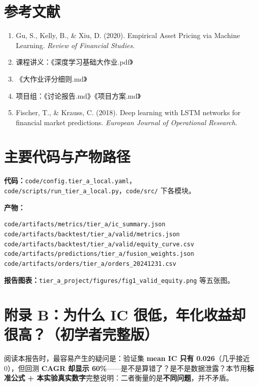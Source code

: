 \documentclass[UTF8,a4paper,12pt]{ctexart}
\begin{document}
\section*{参考文献}

\begin{enumerate}[leftmargin=2em]
  \item Gu, S., Kelly, B., \& Xiu, D. (2020). Empirical Asset Pricing via Machine Learning. \textit{Review of Financial Studies}.
  \item 课程讲义：《深度学习基础大作业.pdf》
  \item 《大作业评分细则.md》
  \item 项目组：《讨论报告.md》《项目方案.md》
  \item Fischer, T., \& Krauss, C. (2018). Deep learning with LSTM networks for financial market predictions. \textit{European Journal of Operational Research}.
\end{enumerate}

\appendix
\section{主要代码与产物路径}

\textbf{代码：}\texttt{code/config.tier\_a\_local.yaml}，\texttt{code/scripts/run\_tier\_a\_local.py}，\texttt{code/src/} 下各模块。

\textbf{产物：}
\begin{verbatim}
code/artifacts/metrics/tier_a/ic_summary.json
code/artifacts/backtest/tier_a/valid/metrics.json
code/artifacts/backtest/tier_a/valid/equity_curve.csv
code/artifacts/predictions/tier_a/fusion_weights.json
code/artifacts/orders/tier_a/orders_20241231.csv
\end{verbatim}

\textbf{报告图表：}\texttt{tier\_a\_project/figures/fig1\_valid\_equity.png} 等五张图。

\section{附录 B：为什么 IC 很低，年化收益却很高？（初学者完整版）}
\label{app:ic-vs-return}

阅读本报告时，最容易产生的疑问是：验证集 \textbf{mean IC 只有 0.026}（几乎接近 0），但回测 \textbf{CAGR 却显示 60\%}——是不是算错了？是不是数据泄露？本节用\textbf{标准公式 + 本实验真实数字}完整说明：二者衡量的是\textbf{不同问题}，并不矛盾。
\end{document}
